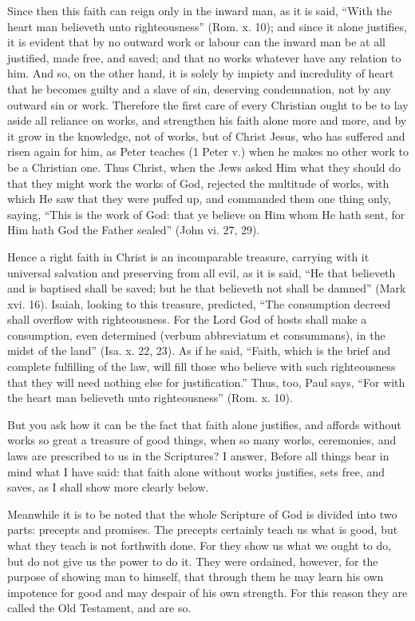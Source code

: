 Since then this faith can reign only in the inward man, as it is said,
``With the heart man believeth unto righteousness'' (Rom. x. 10); and since
it alone justifies, it is evident that by no outward work or labour can
the inward man be at all justified, made free, and saved; and that no
works whatever have any relation to him. And so, on the other hand, it is
solely by impiety and incredulity of heart that he becomes guilty and a
slave of sin, deserving condemnation, not by any outward sin or work.
Therefore the first care of every Christian ought to be to lay aside all
reliance on works, and strengthen his faith alone more and more, and by it
grow in the knowledge, not of works, but of Christ Jesus, who has suffered
and risen again for him, as Peter teaches (1 Peter v.) when he makes no
other work to be a Christian one. Thus Christ, when the Jews asked Him
what they should do that they might work the works of God, rejected the
multitude of works, with which He saw that they were puffed up, and
commanded them one thing only, saying, ``This is the work of God: that ye
believe on Him whom He hath sent, for Him hath God the Father sealed''
(John vi. 27, 29).

Hence a right faith in Christ is an incomparable treasure, carrying with
it universal salvation and preserving from all evil, as it is said, ``He
that believeth and is baptised shall be saved; but he that believeth not
shall be damned'' (Mark xvi. 16). Isaiah, looking to this treasure,
predicted, ``The consumption decreed shall overflow with righteousness. For
the Lord God of hosts shall make a consumption, even determined (verbum
abbreviatum et consummans), in the midst of the land'' (Isa. x. 22, 23). As
if he said, ``Faith, which is the brief and complete fulfilling of the law,
will fill those who believe with such righteousness that they will need
nothing else for justification.'' Thus, too, Paul says, ``For with the heart
man believeth unto righteousness'' (Rom. x. 10).

But you ask how it can be the fact that faith alone justifies, and affords
without works so great a treasure of good things, when so many works,
ceremonies, and laws are prescribed to us in the Scriptures? I answer,
Before all things bear in mind what I have said: that faith alone without
works justifies, sets free, and saves, as I shall show more clearly below.

Meanwhile it is to be noted that the whole Scripture of God is divided
into two parts: precepts and promises. The precepts certainly teach us
what is good, but what they teach is not forthwith done. For they show us
what we ought to do, but do not give us the power to do it. They were
ordained, however, for the purpose of showing man to himself, that through
them he may learn his own impotence for good and may despair of his own
strength. For this reason they are called the Old Testament, and are so.

